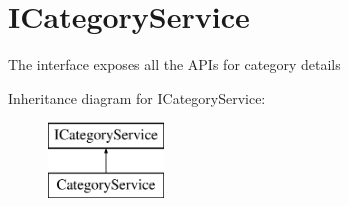 \hypertarget{interfaceWildLifeTracker_1_1ICategoryService}{}\section{I\+Category\+Service}
\label{interfaceWildLifeTracker_1_1ICategoryService}


The interface exposes all the A\+P\+Is for category details  


Inheritance diagram for I\+Category\+Service\+:\begin{figure}[H]
\begin{center}
\leavevmode
\includegraphics[height=2.000000cm]{interfaceWildLifeTracker_1_1ICategoryService}
\end{center}
\end{figure}
